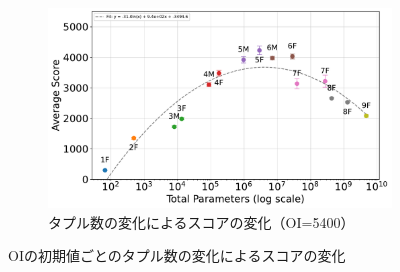 \begin{figure}[t]
    \vspace{1em}
    \begin{subfigure}[b]{\linewidth}
        \centering
        \includegraphics[width=\linewidth]{pdf/parameter_performance_plots/params_performance_OI5400_EXP1.pdf}
        \caption{タプル数の変化によるスコアの変化（OI=5400）}
        \label{fig:score_vs_tuple_OI5400}
    \end{subfigure}

    \caption{OIの初期値ごとのタプル数の変化によるスコアの変化}
    \label{fig:score_vs_tuple_all}
\end{figure}

